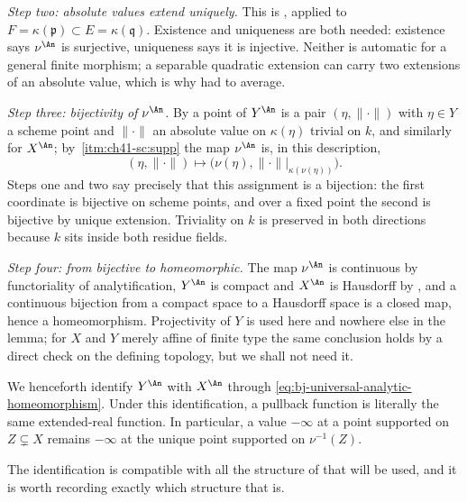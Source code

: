 \emph{Step two: absolute values extend uniquely.}  This is
, applied to
$F=\kappa(\mathfrak p)\subset E=\kappa(\mathfrak q)$.  Existence and
uniqueness are both needed: existence says $\nu^{\An}$ is surjective,
uniqueness says it is injective.  Neither is automatic for a general finite
morphism; a separable quadratic extension can carry two extensions of
an absolute value, which is why
 had to average.

\emph{Step three: bijectivity of $\nu^{\An}$.}  By
 a point of $Y^{\An}$ is a pair
$(\eta,\lVert\cdot\rVert)$ with $\eta\in Y$ a scheme point and
$\lVert\cdot\rVert$ an absolute value on $\kappa(\eta)$ trivial on
$k$, and similarly for $X^{\An}$; by
\,\cref{itm:ch41-sc:supp} the map
$\nu^{\An}$ is, in this description,
\[
 (\eta,\lVert\cdot\rVert)\longmapsto
 \bigl(\nu(\eta),\lVert\cdot\rVert|_{\kappa(\nu(\eta))}\bigr).
\]
Steps one and two say precisely that this assignment is a bijection: the
first coordinate is bijective on scheme points, and over a fixed point the
second is bijective by unique extension.  Triviality on $k$ is preserved
in both directions because $k$ sits inside both residue fields.

\emph{Step four: from bijective to homeomorphic.}  The map $\nu^{\An}$ is
continuous by functoriality of analytification, $Y^{\An}$ is compact and
$X^{\An}$ is Hausdorff by , and a
continuous bijection from a compact space to a Hausdorff space is a closed
map, hence a homeomorphism.  Projectivity of $Y$ is used here and nowhere
else in the lemma; for $X$ and $Y$ merely affine of finite type the same
conclusion holds by a direct check on the defining topology, but we shall
not need it.

We henceforth identify $Y^{\An}$ with $X^{\An}$ through
\eqref{eq:bj-universal-analytic-homeomorphism}.
Under this identification, a pullback function is literally the same
extended-real function.
In particular, a value $-\infty$ at a point supported on
$Z\subsetneq X$ remains $-\infty$ at the unique point supported on
$\nu^{-1}(Z)$.

The identification is compatible with all the structure of
 that will be used, and it is worth
recording exactly which structure that is.

